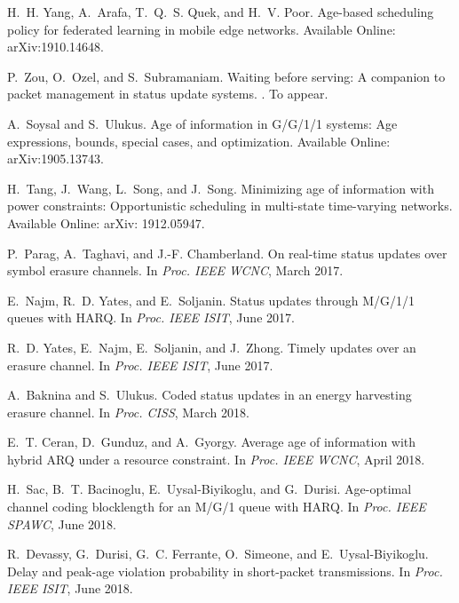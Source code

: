 \documentclass[12pt,journal,onecolumn]{IEEEtran}
\begin{document}
\begin{thebibliography}{10}
H.~H. Yang, A.~Arafa, T.~Q.~S. Quek, and H.~V. Poor.
\newblock Age-based scheduling policy for federated learning in mobile edge
  networks.
\newblock Available Online: ar{X}iv:1910.14648.

P.~Zou, O.~Ozel, and S.~Subramaniam.
\newblock Waiting before serving: A companion to packet management in status
  update systems.
.
\newblock To appear.

A.~Soysal and S.~Ulukus.
\newblock Age of information in {G/G/1/1} systems: Age expressions, bounds,
  special cases, and optimization.
\newblock Available Online: ar{X}iv:1905.13743.

H.~Tang, J.~Wang, L.~Song, and J.~Song.
\newblock Minimizing age of information with power constraints: Opportunistic
  scheduling in multi-state time-varying networks.
\newblock Available Online: ar{X}iv: 1912.05947.

P.~Parag, A.~Taghavi, and J.-F. Chamberland.
\newblock On real-time status updates over symbol erasure channels.
\newblock In {\em Proc. IEEE WCNC}, March 2017.

E.~Najm, R.~D. Yates, and E.~Soljanin.
\newblock Status updates through {M/G/1/1} queues with {HARQ}.
\newblock In {\em Proc. IEEE ISIT}, June 2017.

R.~D. Yates, E.~Najm, E.~Soljanin, and J.~Zhong.
\newblock Timely updates over an erasure channel.
\newblock In {\em Proc. IEEE ISIT}, June 2017.

A.~Baknina and S.~Ulukus.
\newblock Coded status updates in an energy harvesting erasure channel.
\newblock In {\em Proc. CISS}, March 2018.

E.~T. Ceran, D.~Gunduz, and A.~Gyorgy.
\newblock Average age of information with hybrid {ARQ} under a resource
  constraint.
\newblock In {\em Proc. IEEE WCNC}, April 2018.

H.~Sac, B.~T. Bacinoglu, E.~Uysal-Biyikoglu, and G.~Durisi.
\newblock Age-optimal channel coding blocklength for an {M/G/1} queue with
  {HARQ}.
\newblock In {\em Proc. IEEE SPAWC}, June 2018.

R.~Devassy, G.~Durisi, G.~C. Ferrante, O.~Simeone, and E.~Uysal-Biyikoglu.
\newblock Delay and peak-age violation probability in short-packet
  transmissions.
\newblock In {\em Proc. IEEE ISIT}, June 2018.


\end{thebibliography}
\end{document}
